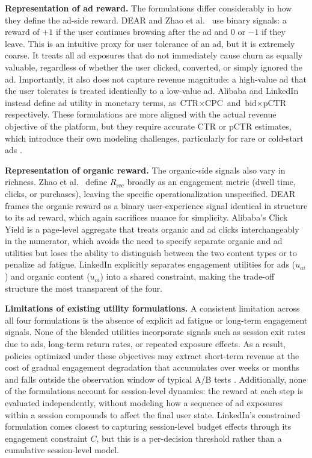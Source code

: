 \documentclass[manuscript,review,screen]{acmart}
\begin{document}
\textbf{Representation of ad reward.}
The formulations differ considerably in how they define the ad-side reward. DEAR \cite{zhao2021dear} and Zhao et al.\ \cite{zhao2020jointly} use binary signals: a reward of $+1$ if the user continues browsing after the ad and $0$ or $-1$ if they leave. This is an intuitive proxy for user tolerance of an ad, but it is extremely coarse. It treats all ad exposures that do not immediately cause churn as equally valuable, regardless of whether the user clicked, converted, or simply ignored the ad. Importantly, it also does not capture revenue magnitude: a high-value ad that the user tolerates is treated identically to a low-value ad. Alibaba \cite{zhang2018whole} and LinkedIn \cite{yan2020ads} instead define ad utility in monetary terms, as $\text{CTR} \times \text{CPC}$ and $\text{bid} \times \text{pCTR}$ respectively. These formulations are more aligned with the actual revenue objective of the platform, but they require accurate CTR or pCTR estimates, which introduce their own modeling challenges, particularly for rare or cold-start ads \cite{mcmahan2013ad}.

\textbf{Representation of organic reward.}
The organic-side signals also vary in richness. Zhao et al.\ \cite{zhao2020jointly} define $R_{\text{rec}}$ broadly as an engagement metric (dwell time, clicks, or purchases), leaving the specific operationalization unspecified. DEAR \cite{zhao2021dear} frames the organic reward as a binary user-experience signal identical in structure to its ad reward, which again sacrifices nuance for simplicity. Alibaba's Click Yield \cite{zhang2018whole} is a page-level aggregate that treats organic and ad clicks interchangeably in the numerator, which avoids the need to specify separate organic and ad utilities but loses the ability to distinguish between the two content types or to penalize ad fatigue. LinkedIn \cite{yan2020ads} explicitly separates engagement utilities for ads ($u_{ai}$) and organic content ($u_{oi}$) into a shared constraint, making the trade-off structure the most transparent of the four.

\textbf{Limitations of existing utility formulations.}
A consistent limitation across all four formulations is the absence of explicit ad fatigue or long-term engagement signals. None of the blended utilities incorporate signals such as session exit rates due to ads, long-term return rates, or repeated exposure effects. As a result, policies optimized under these objectives may extract short-term revenue at the cost of gradual engagement degradation that accumulates over weeks or months and falls outside the observation window of typical A/B tests \cite{hohnhold2015focusing, mcdonald2023impatient}. Additionally, none of the formulations account for session-level dynamics: the reward at each step is evaluated independently, without modeling how a sequence of ad exposures within a session compounds to affect the final user state. LinkedIn's constrained formulation comes closest to capturing session-level budget effects through its engagement constraint $C$, but this is a per-decision threshold rather than a cumulative session-level model.
\end{document}
